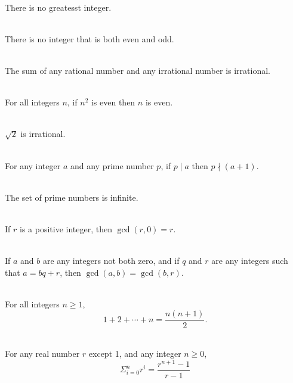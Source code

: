 \documentclass[12pt]{article}
\begin{document}
\begin{theorem}[4.6.1]
\hfill\\
\normalfont There is no greatesst integer.
\end{theorem}
\begin{theorem}[4.6.2]
\hfill\\
\normalfont There is no integer that is both even and odd.
\end{theorem}
\begin{theorem}[4.6.3]
\hfill\\
\normalfont The sum of any rational number and any irrational number is irrational.
\end{theorem}
\begin{proposition}[4.6.4]
\hfill\\
\normalfont For all integers $n$, if $n^2$ is even then $n$ is even.
\end{proposition}
\begin{theorem}[4.7.1]
\hfill\\
\normalfont $\sqrt{2}$ is irrational.
\end{theorem}
\begin{proposition}[4.7.3]
\hfill\\
\normalfont For any integer $a$ and any prime number $p$, if $p \mid a$ then $p \nmid (a + 1)$.
\end{proposition}
\begin{proposition}[4.7.4]
\hfill\\
\normalfont The set of prime numbers is infinite.
\end{proposition}
\begin{lemma}[4.8.1]
\hfill\\
\normalfont If $r$ is a positive integer, then $\gcd(r, 0) = r$.
\end{lemma}
\begin{lemma}[4.8.2]
\hfill\\
\normalfont If $a$ and $b$ are any integers not both zero, and if $q$ and $r$ are any integers such that
$a = bq + r$, then $\gcd(a, b) = \gcd(b,r)$.
\end{lemma}
\begin{theorem}[5.2.2]
\hfill\\
\normalfont For all integers $n \geq 1$,
\[1 + 2 +\cdots+ n = \frac{n(n + 1)}{2}.\]
\end{theorem}
\begin{theorem}[5.2.3]
\hfill\\
\normalfont For any real number $r$ except 1, and any integer $n \geq 0$,
\[
\Sigma^{n}_{i=0}r^i = \frac{r^{n+1}-1}{r-1}
\]
\end{theorem}
\end{document}
